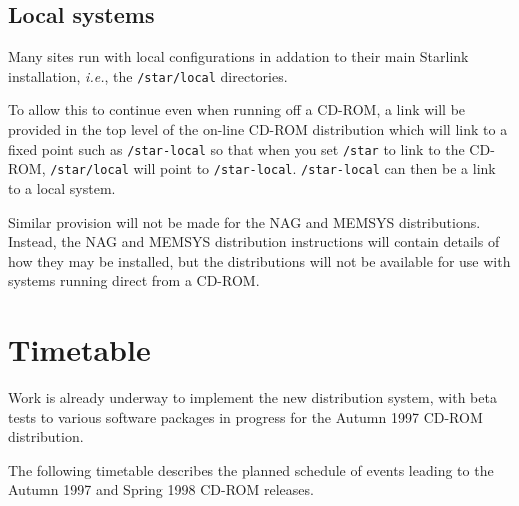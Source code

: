 \documentclass[twoside,11pt]{article}
\newcommand{\xlabel}[1]{}
\begin{document}
\subsection{\label{local_systems}\xlabel{local_systems}Local systems}

Many sites run with local configurations in addation to their main Starlink
installation, \emph{i.e.},\/ the \texttt{/star/local} directories.

To allow this to continue even when running off a CD-ROM, a link will
be provided in the top level of the on-line CD-ROM distribution which
will link to a fixed point such as \texttt{/star-local} so that when you set
\texttt{/star} to link to the CD-ROM, \texttt{/star/local} will point to
\texttt{/star-local}.  \texttt{/star-local} can then be a link to a local
system.

Similar provision will not be made for the NAG and MEMSYS
distributions.  Instead, the NAG and MEMSYS distribution instructions
will contain details of how they may be installed, but the
distributions will not be available for use with systems running direct
from a CD-ROM.

\newpage
\appendix

\section{\label{timetable}\xlabel{timetable}Timetable}

Work is already underway to implement the new distribution system, with 
beta tests to various software packages in progress for the Autumn 1997 CD-ROM
distribution.  

The following timetable describes the planned schedule of events leading to 
the Autumn 1997 and Spring 1998 CD-ROM releases.  
\end{document}
